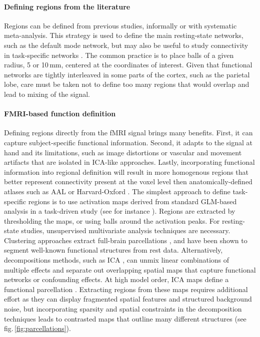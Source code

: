 \documentclass[5p]{elsarticle}
\begin{document}
\paragraph{Defining regions from the literature}
%
Regions can be defined from previous studies, informally or with
systematic meta-analysis. This strategy is used to define the main
resting-state networks, such as the default mode network, but may also be
useful to study connectivity in task-specific networks
\cite{biswal1995,rissman2004,dosenbach2006,grillon2012}. The common practice is to place balls of a given
radius, 5 or 10\,mm, centered at the coordinates of interest. Given that
functional networks are tightly interleaved in some parts of the cortex,
such as the parietal lobe, care must be taken not to define too many
regions that would overlap and lead to mixing of the signal.

\paragraph{FMRI-based function definition}
%
Defining regions directly from the fMRI signal brings many benefits.
First, it can capture subject-specific functional information. Second, it
adapts to the signal at hand and its limitations, such as
image distortions or vascular and movement artifacts that are isolated
in ICA-like approaches. Lastly, incorporating functional information into
regional definition will result in more homogenous regions that better represent
connectivity present at the voxel level then anatomically-defined atlases such
as AAL or Harvard-Oxford \cite{craddock2012}. The simplest approach to define task-specific
regions is to use activation maps derived from standard GLM-based
analysis in a task-driven study (see for instance \cite{poldrack2011}).
Regions are extracted by thresholding the maps, or using balls around the
activation peaks. For resting-state studies, unsupervised multivariate
analysis techniques are necessary. Clustering approaches extract
full-brain parcellations \cite{craddock2012,bellec2010,yeo2011,thirion2006}, and have been shown to segment well-known functional
structures from rest data. Alternatively, decompositions
methods, such as ICA \cite{beckmann2004}, can unmix linear
combinations of multiple effects and separate out overlapping spatial maps
that capture functional networks or confounding effects. At high model
order, ICA maps define a functional parcellation \cite{kiviniemi2009}.
Extracting regions from these maps requires additional effort as they can
display fragmented spatial features and structured background noise, but
incorporating sparsity and spatial constraints in the decomposition
techniques leads to contrasted maps that outline many different
structures \cite{varoquaux2012} (see fig.\,\ref{fig:parcellations}).
\end{document}

